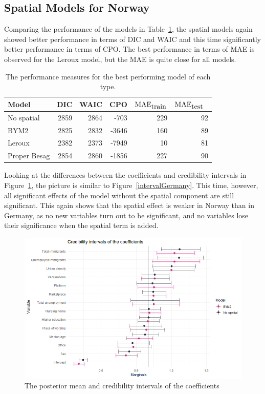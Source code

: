 \subsection{Spatial Models for Norway}\label{sec:spatial_norway}
Comparing the performance of the models in Table~\ref{allNorway}, the spatial models again showed better performance in terms of DIC and WAIC and this time significantly better performance in terms of CPO. The best performance in terms of MAE is observed for the Leroux model, but the MAE is quite close for all models.
\begin{table}[H] 
\caption{The performance measures for the best performing model of each type. \label{allNorway}}
\begin{tabular}{l r r r r r}
\toprule
\textbf{Model}	& \textbf{DIC}	& \textbf{WAIC} & \textbf{CPO} & \textbf{$\hbox{MAE}_{\hbox{train}}$} & \textbf{$\hbox{MAE}_{\hbox{test}}$}\ \\
\midrule
No spatial & 2859 & 2864 & -703 & 229 & 92 \\
BYM2 & 2825 & 2832 & -3646 & 160 & 89\\
Leroux & 2382 & 2373 & -7949 & 10 & 81\\
Proper Besag & 2854 & 2860 & -1856 & 227 & 90 \\
\bottomrule
\end{tabular}
\end{table}
Looking at the differences between the coefficients and credibility intervals in Figure~\ref{intervalNorway}, the picture is similar to Figure~\ref{intervalGermany}. This time, however, all significant effects of the model without the spatial component are still significant. This again shows that the spatial effect is weaker in Norway than in Germany, as no new variables turn out to be significant, and no variables lose their significance when the spatial term is added.
\begin{figure}[H]
  \centering
  \includegraphics[width = \textwidth]{intervals_norway.png}
  \caption{The posterior mean and credibility intervals of the coefficients}
  \label{intervalNorway}
\end{figure}
